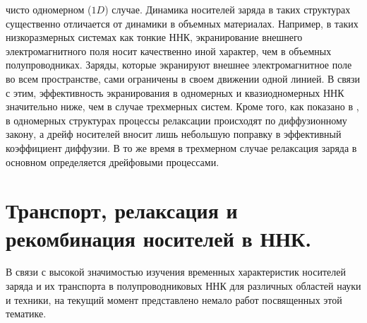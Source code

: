\documentclass[a4paper,14pt,russian]{extreport}
\begin{document}
чисто одномерном ($1D$) случае. Динамика носителей заряда в таких структурах существенно отличается от динамики в объемных материалах. Например, в таких низкоразмерных системах как тонкие ННК, экранирование внешнего электромагнитного поля носит качественно иной характер, чем в объемных полупроводниках. Заряды, которые экранируют внешнее электромагнитное поле во всем пространстве, сами ограничены в своем движении одной линией. В связи с этим, эффективность экранирования в одномерных и квазиодномерных ННК значительно ниже, чем в случае трехмерных систем. Кроме того, как показано в \cite{SiliconNWContactPhenomena}, в одномерных структурах процессы релаксации происходят по диффузионному закону, а дрейф носителей вносит лишь небольшую поправку в эффективный коэффициент диффузии. В то же время в трехмерном случае релаксация заряда в основном определяется дрейфовыми процессами.\par

		\section{Транспорт, релаксация и рекомбинация носителей в ННК.}
			В связи с высокой значимостью изучения временных характеристик носителей заряда и их транспорта в полупроводниковых ННК для различных областей науки и техники, на текущий момент представлено немало работ посвященных этой тематике.
\end{document}
